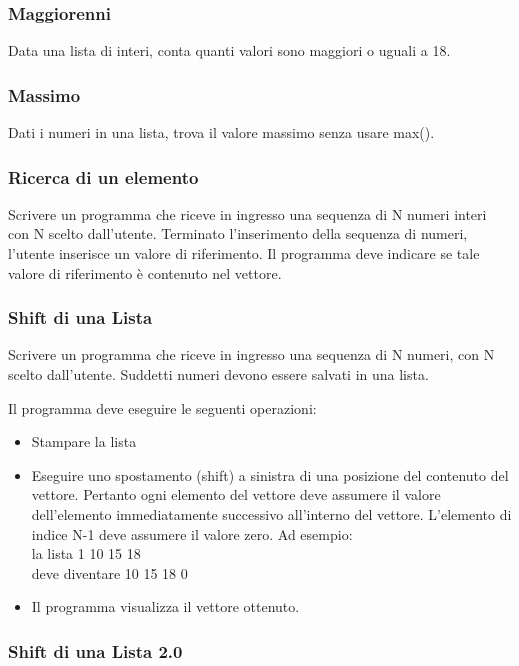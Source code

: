 \documentclass[a4paper,12pt]{article}
\begin{document}
	
	
	\subsubsection{Maggiorenni}
	Data una lista di interi, conta quanti valori sono maggiori o uguali a 18.
	
	
	\subsubsection{Massimo}
	Dati i numeri in una lista, trova il valore massimo senza usare max().
	
	\subsubsection{Ricerca di un elemento}
	Scrivere un programma che riceve in ingresso una sequenza di N numeri
	interi con N scelto dall'utente. 
	Terminato l’inserimento della sequenza di numeri, l’utente inserisce un valore di riferimento. Il programma deve indicare se tale
	valore di riferimento è contenuto nel vettore.
	
	
	\subsubsection{Shift di una Lista}
	
	Scrivere un programma che riceve in ingresso una sequenza di N numeri, con N scelto dall'utente. Suddetti numeri devono essere salvati in una lista.
	
	Il programma deve eseguire le seguenti operazioni:
	
	\begin{itemize}
		\item Stampare la lista
		\item Eseguire uno spostamento (shift) a sinistra di una posizione del contenuto del vettore.
		Pertanto ogni elemento del vettore deve assumere il valore dell’elemento immediatamente successivo all’interno del vettore. L’elemento di indice N-1 deve assumere il
		valore zero.
		Ad esempio: \\ 
		la lista 1 10 15 18 \\
		deve diventare 10 15 18 0
		\item Il programma visualizza il vettore ottenuto.
	\end{itemize}
	
	\subsubsection{Shift di una Lista 2.0}
	
\end{document}

